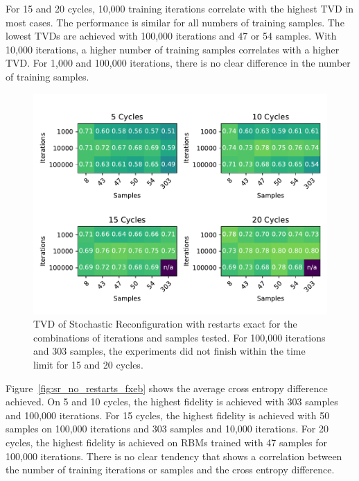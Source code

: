For 15 and 20 cycles, 10,000 training iterations correlate with the highest TVD in most cases.
The performance is similar for all numbers of training samples. The lowest TVDs are achieved with 100,000
iterations and 47 or 54 samples. With 10,000 iterations, a higher number of training samples correlates 
with a higher TVD. For 1,000 and 100,000 iterations, there is no clear difference in the number of training 
samples.

\begin{figure}[H]
  \centering
  \includegraphics[width=\textwidth]{figures/results/SR-restarts-not-learned/tvd_heatmap.pdf}
  \caption[TVD of RBMs Trained with Stochastic Reconfiguration with Random Restarts and $CZ$ Gates Applied Exactly]{TVD of Stochastic 
  Reconfiguration with restarts exact for the combinations of iterations and samples tested.
  For 100,000 iterations and 303 samples, the experiments did not finish within the time limit for 15 and 20 cycles.}
  \label{fig:sr_exact_tvd}
\end{figure}

Figure~\ref{fig:sr_no_restarts_fxeb} shows the average cross entropy difference achieved. On 5 and 10
cycles, the highest fidelity is achieved with 303 samples and 100,000 iterations. 
For 15 cycles, the highest fidelity is achieved with 50 samples on 100,000 iterations and 
303 samples and 10,000 iterations.
For 20 cycles, the highest fidelity is achieved on RBMs trained with 47 samples for 100,000 iterations.
There is no clear tendency that shows a correlation between 
the number of training iterations or samples and the cross entropy difference.

